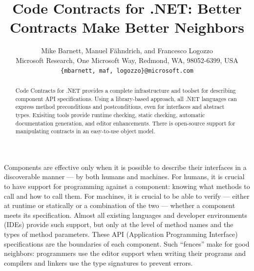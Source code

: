 \documentclass[10pt,twocolumn]{article}
\begin{document}
\title{Code Contracts for .NET: Better Contracts Make Better Neighbors} 

\author{Mike Barnett, Manuel F\"ahndrich, and Francesco Logozzo\\
Microsoft Research, One Microsoft Way, Redmond, WA, 98052-6399, USA\\
{\tt \{mbarnett, maf, logozzo\}@microsoft.com}\\
}

\maketitle
\thispagestyle{empty}

\begin{abstract}
Code Contracts for .NET provides a complete infrastructure and toolset for describing
component API specifications.
Using a library-based approach, all .NET languages can express method preconditions
and postconditions, even for interfaces and abstract types.
Exisiting tools provide runtime checking, static checking, automatic documentation generation,
and editor enhancements.
There is open-source support for manipulating contracts in an easy-to-use object model.
\end{abstract}
\vspace*{-5mm}

Components are effective only when it is possible to describe their interfaces
in a discoverable manner --- by both humans and machines.
For humans, it is crucial to have support for programming against a component:
knowing what methods to call and how to call them.
For machines, it is crucial to be able to verify --- either at runtime or
statically or a combination of the two --- whether a component meets its
specification.
Almost all existing languages and developer environments (IDEs) provide
such support, but only at the level of method names and the types of method
parameters.
These API (Application Programming Interface) specifications are the boundaries
of each component.
Such ``fences'' make for good neighbors:
programmers use the editor support
when writing their programs and compilers and linkers use the type signatures
to prevent errors.
\end{document}
